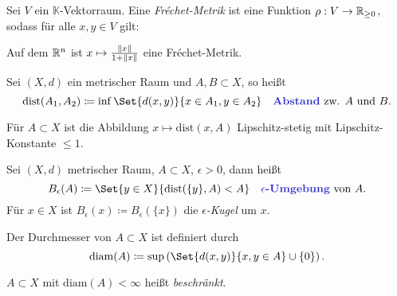 \documentclass{cheat-sheet}
\newcommand{\K}{\mathbb{K}}
\newcommand{\dist}{\mathrm{dist}} %
\newcommand{\diam}{\mathrm{diam}} %
\begin{document}

\begin{definition}
  Sei $V$ ein $\K$-Vektorraum. Eine \emph{Fréchet-Metrik} ist eine Funktion $\rho : V \to \mathbb{R}_{\geq 0}$, sodass für alle $x, y \in V$ gilt:
  \begin{itemize}
  \end{itemize}
\end{definition}

\begin{bsp}
  Auf dem $\mathbb{R}^n$ ist $x \mapsto \tfrac{\lVert x\rVert}{1 + \lVert x\rVert}$ eine Fréchet-Metrik.
\end{bsp}

\begin{definition}
  Sei $(X, d)$ ein metrischer Raum und $A, B \subset X$, so heißt
  \[ \dist(A_1, A_2) \coloneqq \inf \Set{ d(x,y) }{ x \in A_1, y \in A_2 } \quad \text{\emph{Abstand} zw. $A$ und $B$.} \]
\end{definition}


\begin{bem}
  Für $A \subset X$ ist die Abbildung $x \mapsto \dist(x, A)$ Lipschitz-stetig mit Lipschitz-Konstante $\leq 1$.
\end{bem}

\begin{definition}
  Sei $(X, d)$ metrischer Raum, $A \subset X$, $\epsilon > 0$, dann heißt
  \[ B_\epsilon(A) \coloneqq \Set{ y \in X }{ \dist(\{ y \}, A) < A} \quad \text{\emph{$\epsilon$-Umgebung} von $A$.} \]
  Für $x \in X$ ist $B_\epsilon(x) \coloneqq B_\epsilon(\{ x \})$ die \emph{$\epsilon$-Kugel} um $x$.
\end{definition}

\begin{definition}
  Der Durchmesser von $A \subset X$ ist definiert durch
  \[ \diam(A) \coloneqq \sup \left( \Set{ d(x, y) }{ x, y \in A } \cup \{ 0 \} \right). \]
\end{definition}

\begin{definition}
  $A {\subset} X$ mit $\diam(A) < \infty$ heißt \emph{beschränkt}.
\end{definition}
\end{document}
